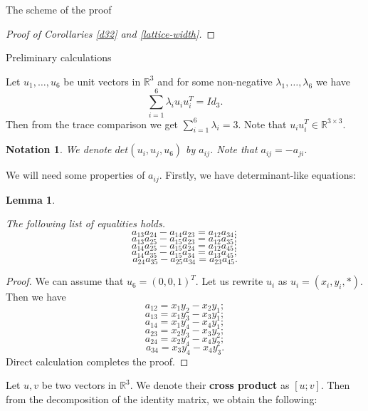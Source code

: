 \documentclass[12pt]{article}
\newtheorem{lemma}{Lemma}[section]
\newtheorem{notation}{Notation}[section]
\begin{document}
\begin{section}{The scheme of the proof}
\begin{proof}[Proof of Corollaries \ref{d32} and \ref{lattice-width}]
    \end{proof}



\begin{section}{Preliminary calculations}

    Let $u_{1},\ldots,u_{6}$ be unit vectors in $\mathbb{R}^{3}$ and for some non-negative 
    $\lambda_{1},\ldots,\lambda_{6}$ we have 
    $$
        \sum_{i=1}^{6}\lambda_{i}u_{i}u_{i}^{T} = Id_{3}.
    $$    
Then from the trace comparison we get $\sum_{i=1}^{6} \lambda_{i} = 3.$ Note that $u_{i}u_{i}^{T}\in \mathbb{R}^{3\times 3}.$
    
    \begin{notation}
        We denote $det(u_{i},u_{j},u_{6})$ by $a_{ij}$. Note that $a_{ij} = -a_{ji}.$
    \end{notation}

    We will need some properties of $a_{ij}$. Firstly, we have determinant-like equations:
    
    \begin{lemma}
    \label{det-like}
        
    The following list of equalities holds.
        $$
            a_{13}a_{24} - a_{14}a_{23} = a_{12}a_{34};
        $$
        $$
            a_{13}a_{25} - a_{15}a_{23} = a_{12}a_{35};
        $$
        $$
            a_{14}a_{25} - a_{15}a_{24} = a_{12}a_{45};
        $$
        $$
            a_{14}a_{35} - a_{15}a_{34} = a_{13}a_{45};
        $$
        $$
            a_{24}a_{35} - a_{25}a_{34} = a_{23}a_{45}.
        $$
    \end{lemma}

    \begin{proof}
       We can assume that $u_{6} = (0,0,1)^{T}$. Let us rewrite $u_{i}$ as $ u_{i} = (x_{i},y_{i},*).$
        Then we have
        $$
            a_{12} = x_{1}y_{2}-x_{2}y_{1}; 
        $$
        $$
            a_{13} = x_{1}y_{3}-x_{3}y_{1};
        $$
        $$
            a_{14} = x_{1}y_{4}-x_{4}y_{1};
        $$
        $$
            a_{23} = x_{2}y_{3}-x_{3}y_{2};
        $$
         $$
            a_{24} = x_{2}y_{4}-x_{4}y_{2};
        $$
        $$
            a_{34} = x_{3}y_{4}-x_{4}y_{3}.
        $$
        Direct calculation completes the proof.
    \end{proof}

        
    Let $u,v$ be two vectors  in $ \mathbb{R}^{3}$. We denote their \textbf{cross product} as $[u;v]$. 
     Then from the decomposition of the identity matrix, we obtain the following:


\end{section}
\end{section}
\end{document}

